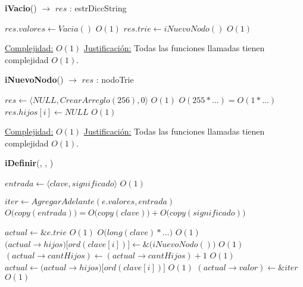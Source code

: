 \bigskip

\begin{Algoritmos}

\medskip

  	\medskip

\begin{algorithm}[H]{\textbf{iVacio}() $\to$ $res$ : estrDiccString}
      \begin{algorithmic}
       \State $res.valores \gets Vacia()$         \Comment $O(1)$
       \State $res.trie \gets iNuevoNodo()$       \Comment $O(1)$

      \medskip
      \Statex \underline{Complejidad:} {$O(1)$}
      \Statex \underline{Justificación:} {Todas las funciones llamadas tienen complejidad $O(1)$.}

      \end{algorithmic}
\end{algorithm}

\begin{algorithm}[H]{\textbf{iNuevoNodo}() $\to$ $res$ : nodoTrie }
      \begin{algorithmic}
        \State $res \gets \big\langle NULL, CrearArreglo(256), 0\big\rangle$ \Comment $O(1)$
                              \Comment $O(255 * ...) = O(1 * ...)$
          \State $res.hijos[i] \gets NULL$         \Comment $O(1)$
        \EndFor

        \medskip
        \Statex \underline{Complejidad:} {$O(1)$}
        \Statex \underline{Justificación:} {Todas las funciones llamadas tienen complejidad $O(1)$.}
      \end{algorithmic}
\end{algorithm}

\begin{algorithm}[H]{\textbf{iDefinir}(, , )}
      \begin{algorithmic}
        \State $entrada \gets \big\langle clave, significado \big\rangle$     \Comment $O(1)$
        \State $ $

        \State $iter \gets AgregarAdelante(e.valores, entrada)$       \Comment $O\big(copy(entrada)\big) = O\big(copy(clave)\big) + O\big(copy(significado)\big)$
        \State $ $

        \State $actual \gets \&e.trie$                              \Comment $O(1)$
             \Comment $O\big(long(clave) * ...\big)$
           \Comment $O(1)$
            \State $\big(actual \to hijos\big)\big[ord(clave[i])\big] \gets \&\big(iNuevoNodo()\big)$   \Comment $O(1)$
            \State $(actual \to cantHijos) \gets (actual \to cantHijos) + 1$   \Comment $O(1)$
          \EndIf
          \State $actual \gets \big(actual \to hijos\big)\big[ord(clave[i])\big]$ \Comment $O(1)$
        \EndFor
        \State $(actual \to valor) \gets \&iter$   \Comment $O(1)$


\end{algorithmic}
\end{algorithm}
\end{Algoritmos}
